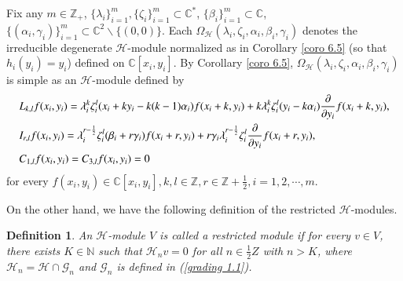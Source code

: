 \documentclass[12pt,reqno]{amsart}
\def\Z{\mathbb{Z}}
\def\N{\mathbb{N}}
\def\C{\mathbb{C}}
\numberwithin{equation}{section}
\newtheorem{defi}[theo]{Definition}
\begin{document}
Fix any $m\in\Z_+$, $\{\lambda_i\}_{i=1}^m,\{\zeta_i\}_{i=1}^m\subset\C^*$, $\{\beta_i\}_{i=1}^m\subset\C$, $\{(\alpha_i, \gamma_i)\}_{i=1}^m\subset\C^2\backslash\{(0,0)\}$. Each $\Omega_{\mathcal{H}}(\lambda_i, \zeta_i,\alpha_i,\beta_i,\gamma_i)$ denotes the irreducible degenerate $\mathcal{H}$-module normalized as in Corollary \ref{coro 6.5} (so that $h_i(y_i)=y_i$) defined on $\C[x_i,y_i]$. By Corollary \ref{coro 6.5}, $\Omega_{\mathcal{H}}(\lambda_i, \zeta_i,\alpha_i,\beta_i,\gamma_i)$ is simple as an $\mathcal{H}$-module defined by
 \begin{equation}\label{act. def 7.1}
\aligned
&L_{k,l} f(x_i,y_i)=\lambda_i^k\zeta_i^l(x_i+ky_i-k(k-1)\alpha_i)f(x_i+k,y_i)+k\lambda_i^k\zeta_i^l(y_i-k\alpha_i)\frac{\partial }{\partial {y_i}}{f(x_i+k,y_i)},\\
&I_{r,l} f(x_i,y_i)=\lambda_i^{r-\frac{1}{2}}\zeta_i^l(\beta_i+r\gamma_i)f(x_i+r,y_i)+r\gamma_i\lambda_i^{r-\frac{1}{2}}\zeta_i^l\frac{\partial }{\partial {y_i}}{f(x_i+r,y_i)},\\ 
&C_{1,l}f(x_i,y_i)=C_{3,l}f(x_i,y_i)=0
\endaligned
\end{equation}
 for every $f(x_i,y_i)\in\C[x_i,y_i],k,l\in\Z,r\in\Z+\frac{1}{2},i=1,2,\cdots,m$. 

 On the other hand, we have the following definition of the restricted $\mathcal{H}$-modules.
 \begin{defi}
  An $\mathcal{H}$-module $V$ is called a restricted module if for every $v\in V$, there exists $K\in\N$ such that $\mathcal{H}_nv=0$ for all $n\in\frac{1}{2}Z$ with $n>K$, where $\mathcal{H}_n=\mathcal{H}\cap \mathcal{G}_n$ and $\mathcal{G}_n$ is defined in (\ref{grading 1.1}).
\end{defi}
\end{document}
